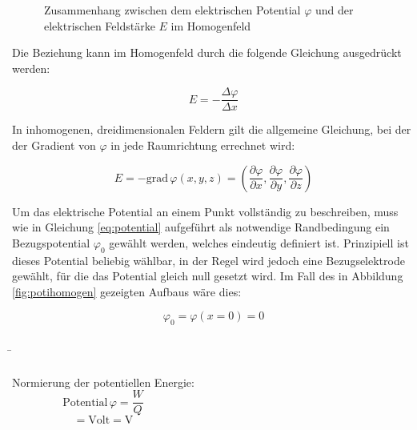 \begin{frame}
{ 

	 \begin{figure}[ht]
		\centering
		\caption{Zusammenhang zwischen dem elektrischen Potential $\varphi$ und der elektrischen Feldstärke $E$ im Homogenfeld}
		\label{fig:potigraph}

	\end{figure}
	

	 Die Beziehung kann im Homogenfeld durch die folgende Gleichung ausgedrückt werden:

	 \begin{equation}
		E = - \frac{\Delta \varphi}{\Delta x} 
	 \end{equation}

	 In inhomogenen, dreidimensionalen Feldern gilt die allgemeine Gleichung, bei der der Gradient von $\varphi$ in jede Raumrichtung errechnet wird: 

	 \begin{equation}
		E = - \mathrm{grad} \,\varphi (x,y,z)  = \left( \frac{\partial \varphi}{\partial x}, \frac{\partial \varphi}{\partial y}, \frac{\partial \varphi}{\partial z} \right)
	 \end{equation}


	 Um das elektrische Potential an einem Punkt vollständig zu beschreiben, muss wie in Gleichung \ref{eq:potential} 
	 aufgeführt als notwendige Randbedingung ein Bezugspotential $\varphi_0$ gewählt werden, welches eindeutig definiert ist. 
	 Prinzipiell ist dieses Potential beliebig wählbar, in der Regel wird jedoch eine Bezugselektrode gewählt, für die das Potential
	 gleich null gesetzt wird. Im Fall des in Abbildung \ref{fig:potihomogen} gezeigten Aufbaus wäre dies:

	 

	 \begin{equation*}
		\varphi_0 = \varphi(x=0) = 0
	 \end{equation*}

	 




	}
	\b{
	\begin{columns}
	  \hspace{-2pt}Normierung der potentiellen Energie:
	   \begin{equation*}
		\mathrm{Potential} \, \varphi = \frac{W}{Q}
	   \end{equation*}
	   \vspace{-10pt} \begin{equation*}
		[\varphi] = \mathrm{Volt} = \mathrm{V} 
	   \end{equation*}


\end{columns}}
\end{frame}
